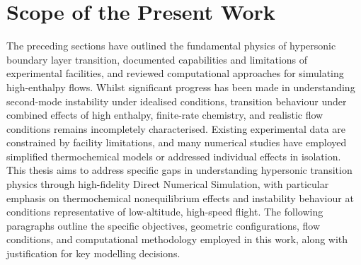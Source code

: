 \section{Scope of the Present Work}\label{section:introduction/scope}

The preceding sections have outlined the fundamental physics of hypersonic boundary layer transition, documented capabilities and limitations of experimental facilities, and reviewed computational approaches for simulating high-enthalpy flows. Whilst significant progress has been made in understanding second-mode instability under idealised conditions, transition behaviour under combined effects of high enthalpy, finite-rate chemistry, and realistic flow conditions remains incompletely characterised. Existing experimental data are constrained by facility limitations, and many numerical studies have employed simplified thermochemical models or addressed individual effects in isolation. This thesis aims to address specific gaps in understanding hypersonic transition physics through high-fidelity Direct Numerical Simulation, with particular emphasis on thermochemical nonequilibrium effects and instability behaviour at conditions representative of low-altitude, high-speed flight. The following paragraphs outline the specific objectives, geometric configurations, flow conditions, and computational methodology employed in this work, along with justification for key modelling decisions.


